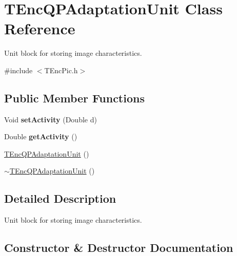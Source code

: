 \hypertarget{class_t_enc_q_p_adaptation_unit}{}\section{T\+Enc\+Q\+P\+Adaptation\+Unit Class Reference}
\label{class_t_enc_q_p_adaptation_unit}


Unit block for storing image characteristics.  




{\ttfamily \#include $<$T\+Enc\+Pic.\+h$>$}

\subsection*{Public Member Functions}
\begin{DoxyCompactItemize}
\item 
\mbox{\label{class_t_enc_q_p_adaptation_unit_acb13a92e9b60615f86eaef33622e7a06}} 
Void {\bfseries set\+Activity} (Double d)
\item 
\mbox{\label{class_t_enc_q_p_adaptation_unit_a57ff6bdce07f6bd457da8fd98dec37f3}} 
Double {\bfseries get\+Activity} ()
\end{DoxyCompactItemize}
{\bf }\par
\begin{DoxyCompactItemize}
\item 
\hyperlink{class_t_enc_q_p_adaptation_unit_a466a9166b1da05127d9ddc3ef0bf0192}{T\+Enc\+Q\+P\+Adaptation\+Unit} ()
\item 
\hyperlink{class_t_enc_q_p_adaptation_unit_ac7108fa56c7fa77c27cbb4c9158ade65}{$\sim$\+T\+Enc\+Q\+P\+Adaptation\+Unit} ()
\end{DoxyCompactItemize}



\subsection{Detailed Description}
Unit block for storing image characteristics. 

\subsection{Constructor \& Destructor Documentation}
\mbox{\label{class_t_enc_q_p_adaptation_unit_a466a9166b1da05127d9ddc3ef0bf0192}} 
